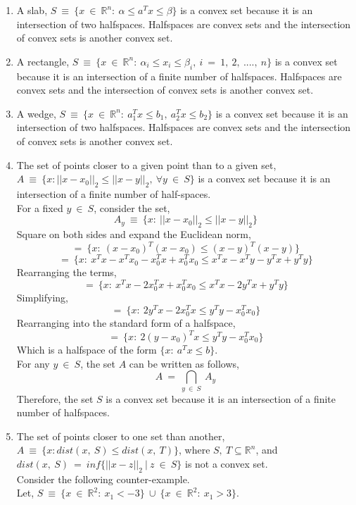 \documentclass[12pt, draftcls, onecolumn]{IEEEtran}
\begin{document}
\begin{enumerate}
    \item A slab, $S\ \equiv\ \{x\ \in\ \mathbb{R}^n:\ \alpha \leq a^Tx \leq \beta\}$ is a convex set because it is an intersection of two halfspaces. Halfspaces are convex sets and the intersection of convex sets is another convex set.
    \item A rectangle, $S\ \equiv\ \{x\ \in\ \mathbb{R}^n:\ \alpha_i \leq x_i \leq \beta_i,\ i\ =\ 1,\ 2,\ ....,\ n\}$ is a convex set because it is an intersection of a finite number of halfspaces. Halfspaces are convex sets and the intersection of convex sets is another convex set.
    \item A wedge, $S\ \equiv\ \{x\ \in\ \mathbb{R}^n:\ a_1^Tx \leq b_1,\ a_2^Tx \leq b_2\}$ is a convex set because it is an intersection of two halfspaces. Halfspaces are convex sets and the intersection of convex sets is another convex set.
    \item The set of points closer to a given point than to a given set, \newline $A\ \equiv\ \{x: ||x-x_0||_2 \leq ||x-y||_2,\ \forall y\ \in\ S\}$ is a convex set because it is an intersection of a finite number of half-spaces.
    \\For a fixed $y\ \in\ S$, consider the set,
    \[A_y\ \equiv\ \{x:\ ||x-x_0||_2 \leq ||x-y||_2\}\]
    Square on both sides and expand the Euclidean norm,
    \[=\ \{x:\ (x-x_0)^T(x-x_0) \leq (x-y)^T(x-y)\}\]
    \[=\ \{x:\ x^Tx-x^Tx_0-x_0^Tx+x_0^Tx_0 \leq x^Tx-x^Ty-y^Tx+y^Ty\}\]
    Rearranging the terms,
    \[=\ \{x:\ x^Tx-2x_0^Tx+x_0^Tx_0 \leq x^Tx-2y^Tx+y^Ty\}\]
    Simplifying,
    \[=\ \{x:\ 2y^Tx-2x_0^Tx \leq y^Ty-x_0^Tx_0\}\]
    Rearranging into the standard form of a halfspace,
    \[=\ \{x:\ 2(y-x_0)^Tx \leq y^Ty-x_0^Tx_0\}\]
    Which is a halfspace of the form $\{x:\ a^Tx \leq b\}$.
    \\For any $y\ \in\ S$, the set $A$ can be written as follows,
    \[A\ =\ \bigcap_{y\ \in\ S}\ A_y\]
    Therefore, the set $S$ is a convex set because it is an intersection of a finite number of halfspaces.
    \item The set of points closer to one set than another, $A\ \equiv\ \{x: dist(x,\ S) \leq dist(x,\ T)\}$, where $S,\ T \subseteq \mathbb{R}^n$, and
    $dist(x,\ S)\ =\ inf\{||x-z||_2\ |\ z\ \in\ S\}$ is not a convex set. \\Consider the following counter-example.
    \\Let, $S\ \equiv\ \{x\ \in\ \mathbb{R}^2:\ x_1 < -3\}\ \cup\ \{x\ \in\ \mathbb{R}^2:\ x_1 > 3\}$.

\end{enumerate}
\end{document}
